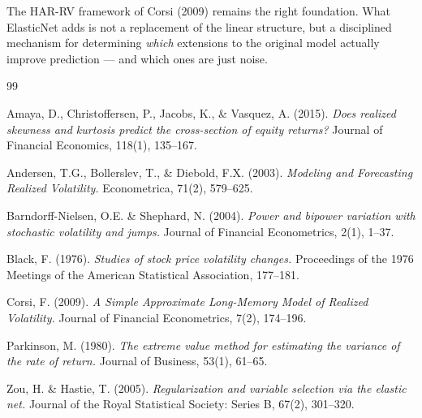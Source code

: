 \documentclass[11pt,a4paper]{article}
\begin{document}
The HAR-RV framework of Corsi (2009) remains the right foundation. What ElasticNet adds is not a replacement of the linear structure, but a disciplined mechanism for determining \textit{which} extensions to the original model actually improve prediction --- and which ones are just noise.



\begin{thebibliography}{99}

Amaya, D., Christoffersen, P., Jacobs, K., \& Vasquez, A. (2015).
\textit{Does realized skewness and kurtosis predict the cross-section of equity returns?}
Journal of Financial Economics, 118(1), 135--167.

Andersen, T.G., Bollerslev, T., \& Diebold, F.X. (2003).
\textit{Modeling and Forecasting Realized Volatility.}
Econometrica, 71(2), 579--625.

Barndorff-Nielsen, O.E. \& Shephard, N. (2004).
\textit{Power and bipower variation with stochastic volatility and jumps.}
Journal of Financial Econometrics, 2(1), 1--37.

Black, F. (1976).
\textit{Studies of stock price volatility changes.}
Proceedings of the 1976 Meetings of the American Statistical Association, 177--181.

Corsi, F. (2009).
\textit{A Simple Approximate Long-Memory Model of Realized Volatility.}
Journal of Financial Econometrics, 7(2), 174--196.

Parkinson, M. (1980).
\textit{The extreme value method for estimating the variance of the rate of return.}
Journal of Business, 53(1), 61--65.

Zou, H. \& Hastie, T. (2005).
\textit{Regularization and variable selection via the elastic net.}
Journal of the Royal Statistical Society: Series B, 67(2), 301--320.

\end{thebibliography}
\end{document}
